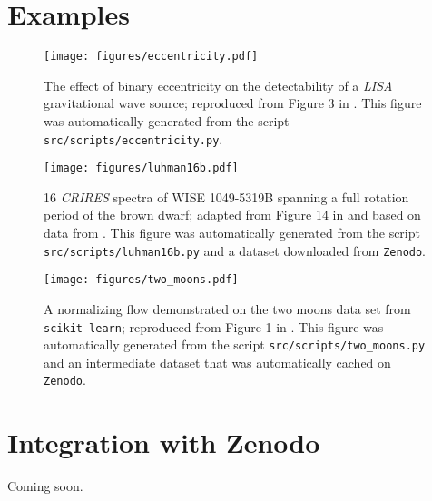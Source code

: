 \documentclass[modern]{aastex631}
\begin{document}
\section{Examples}
\label{sec:examples}

\begin{figure}[ht!]
    \begin{centering}
        \texttt{[image: figures/eccentricity.pdf]}
        \caption{
            The effect of binary eccentricity on the detectability of a \emph{LISA} gravitational wave source; reproduced from Figure 3 in \citet{Wagg2022}. 
            This figure was automatically generated from the script \texttt{src/scripts/eccentricity.py}.
        }
        \label{fig:eccentricity}
    \end{centering}
\end{figure}

\begin{figure}[ht!]
    \begin{centering}
        \texttt{[image: figures/luhman16b.pdf]}
        \caption{
            16 \emph{CRIRES} spectra of WISE 1049-5319B spanning a full rotation period of the brown dwarf; adapted from Figure 14 in \citet{Luger2021} and based on data from \citet{Crossfield2014}.
            This figure was automatically generated from the script \texttt{src/scripts/luhman16b.py} and a dataset downloaded from \texttt{Zenodo}.
        }
        \label{fig:luhman16b}
    \end{centering}
\end{figure}

\begin{figure}[ht!]
    \begin{centering}
        \texttt{[image: figures/two\_moons.pdf]}
        \caption{
            A normalizing flow demonstrated on the two moons data set from \texttt{scikit-learn};
            reproduced from Figure 1 in \citet{Crenshaw2022}.
            This figure was automatically generated from the script \texttt{src/scripts/two\_moons.py}
            and an intermediate dataset that was automatically cached on \texttt{Zenodo}.
        }
        \label{fig:two_moons}
    \end{centering}
\end{figure}

\section{Integration with Zenodo}
\label{sec:zenodo}
%
Coming soon.
\end{document}
